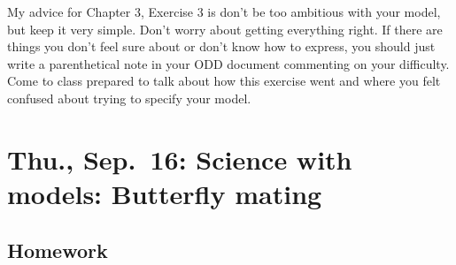 \documentclass[
]{article}
\begin{document}
My advice for Chapter 3, Exercise 3 is don't be too ambitious with your
model, but keep it very simple. Don't worry about getting everything
right. If there are things you don't feel sure about or don't know how
to express, you should just write a parenthetical note in your ODD
document commenting on your difficulty. Come to class prepared to talk
about how this exercise went and where you felt confused about trying to
specify your model.

\hypertarget{thu.-sep.-16-science-with-models-butterfly-mating}{%
\section{Thu., Sep.~16: Science with models: Butterfly
mating}\label{thu.-sep.-16-science-with-models-butterfly-mating}}

\hypertarget{homework-4}{%
\subsection{Homework}\label{homework-4}}
\end{document}
